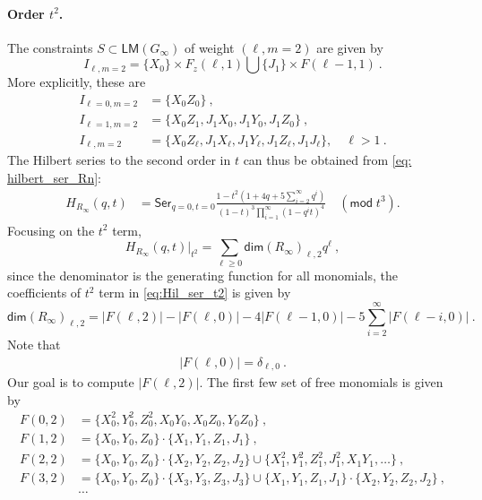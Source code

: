 \documentclass[a4paper,10pt]{article}
\newcommand{\mr}[1]{\mathsf{#1}}
\begin{document}
\paragraph{Order $t^2$.} The constraints $S\subset\mr{LM}(G_\infty)$ of weight $(\ell,m=2)$ are given by
\begin{equation}
I_{\ell,m=2} = \{X_{0}\}\times F_z(\ell, 1)\bigcup \{J_{1}\}\times F(\ell-1, 1)~.
\end{equation}
More explicitly, these are 
\begin{equation}
\begin{aligned}
I_{\ell=0, m = 2} &=\{X_0Z_0\}~,\\
I_{\ell=1, m= 2}  &= \{X_0Z_1, J_1 X_0,J_1Y_0,J_1Z_0\}~,\\
I_{\ell, m=2}  &= \{X_0Z_\ell, J_1 X_\ell,J_1Y_\ell,J_1Z_\ell, J_1J_\ell\}, \quad \ell>1~.
\end{aligned}
\end{equation}
The Hilbert series to the second order in $t$ can thus be obtained from \eqref{eq: hilbert_ser_Rn}:
\begin{equation}
\label{eq:Hil_ser_t2}
\begin{aligned}
H_{R_\infty}(q,t) &= \mr{Ser}_{q=0,t=0}\frac{1-t^2(1+4q + 5\sum_{i=2}^\infty q^i)}{(1-t)^3 \prod_{i=1}^{\infty}\left(1-q^i t\right)^4}\quad (\mr{mod} \;t^3).
\end{aligned}
\end{equation}
Focusing on the $t^2$ term,
\begin{equation}
H_{R_{\infty}}(q, t)|_{t^2}=\sum_{\ell \geq 0} \mr{dim}\left(R_{\infty}\right)_{\ell, 2} q^\ell~,
\end{equation}
since the denominator is the generating function for all monomials, the coefficients of $t^2$ term in \eqref{eq:Hil_ser_t2} is given by
\begin{equation}\label{eq:dimRl2}
\mr{dim}\left(R_{\infty}\right)_{\ell, 2} = |F(\ell,2)|-|F(\ell,0)|-4|F(\ell-1,0)|-5\sum_{i=2}^\infty|F(\ell-i,0)|~.
\end{equation}
Note that 
\begin{equation}
\begin{aligned}
|F(\ell,0)| = \delta_{\ell,0}~.
\end{aligned}
\end{equation}
Our goal is to compute $|F(\ell,2)|$. 
The first few set of free monomials is given  by
\begin{equation}
\begin{aligned}
F(0,2) &= \{X_0^2, Y_0^2,Z_0^2,X_0Y_0,X_0Z_0,Y_0Z_0\}~,\\
F(1,2) &= \{X_0, Y_0, Z_0\}\cdot \{X_1,Y_1,Z_1,J_1\}~,\\
F(2,2) & = \{X_0,Y_0,Z_0\}\cdot \{X_2,Y_2,Z_2,J_2\}\cup\{X_1^2, Y_1^2,Z_1^2,J_1^2,X_1Y_1,\dots\}~,\\
F(3,2) & = \{X_0,Y_0,Z_0\}\cdot \{X_3,Y_3,Z_3,J_3\}\cup\{X_1,Y_1,Z_1,J_1\}\cdot \{X_2,Y_2,Z_2,J_2\}~,\\
&\dots
\end{aligned}
\end{equation}
\end{document}
